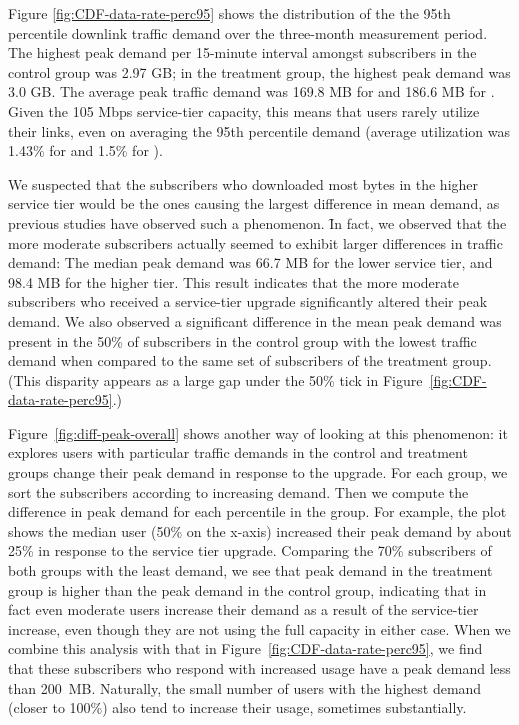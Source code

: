 Figure \ref{fig:CDF-data-rate-perc95} shows the distribution of the the
95th percentile downlink traffic demand over the three-month measurement
period. The highest peak demand per 15-minute interval amongst
subscribers in the control group was 2.97 GB; in the treatment group,
the highest peak demand was 3.0 GB.
The average peak traffic demand was 169.8 MB for \control{} and
186.6 MB for \treatment{}. Given the 105 Mbps service-tier capacity,
this means that users rarely utilize their links,
even on averaging the 95th percentile demand (average utilization was 
1.43\% for \control{} and 1.5\% for \treatment{}).

We suspected that the subscribers who downloaded most bytes in the
higher service tier would be the ones causing the largest difference in
mean demand, as previous studies have observed such a phenomenon. \f{In
  fact, we observed that the more moderate subscribers actually seemed
  to exhibit larger differences in traffic demand: The median peak demand
  was 66.7 MB for the lower service tier, and 98.4 MB for the higher
  tier.  This result indicates that the more moderate subscribers who
  received a service-tier upgrade significantly altered their peak
  demand.}  We also observed a significant difference in the mean peak
demand was present in the 50\% of subscribers in the control group
with the lowest traffic demand when compared to the same set of
subscribers of the treatment group. (This disparity appears as a large
gap under the 50\% tick in Figure~\ref{fig:CDF-data-rate-perc95}.)


Figure~\ref{fig:diff-peak-overall} shows another way of looking at this
phenomenon: it explores users with particular traffic demands in the
control and treatment groups change their peak demand in response to the
upgrade.  For each group, we sort the subscribers according to
increasing demand.  Then we compute the difference in peak demand for
each percentile in the group.  For example, the plot shows the median
user (50\% on the x-axis) increased their peak demand by about 25\% in
response to the service tier upgrade.  Comparing the 70\% subscribers of
both groups with the least demand, we see that peak demand in the
treatment group is higher than the peak demand in the control group,
indicating that in fact even moderate users increase their demand as a
result of the service-tier increase, even though they are not using the
full capacity in either case.
When we combine this analysis with that in
Figure~\ref{fig:CDF-data-rate-perc95}, we find that these subscribers
who respond with increased usage have a peak demand less than 200~MB.
Naturally, the small number of users with the highest demand (closer to
100\%) also tend to increase their usage, sometimes substantially.



